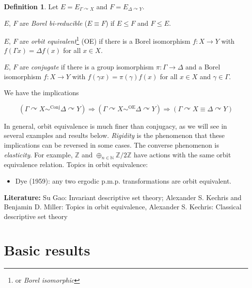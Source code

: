 \documentclass[10pt]{amsart}
\newcommand{\ZZ}{\mathbb{Z}}
\newcommand{\NN}{\mathbb{N}}
\theoremstyle{definition}
\newtheorem*{definition*}{Definition}
\theoremstyle{remark}
\newenvironment{enumerate-(a)}{\begin{enumerate}[label={\upshape (\alph*)}, leftmargin=2pc]}{\end{enumerate}}
\begin{document}
\begin{definition*} 
Let $E=E_{\Gamma\curvearrowright X}$ and $F=E_{\Delta\curvearrowright Y}$. 

\begin{enumerate-(a)} 
\item 
$E$, $F$ are \emph{Borel bi-reducible} ($E\equiv F$) if $E\leq F$ and $F\leq E$. 
\item 
$E$, $F$ are \emph{orbit equivalent}\footnote{or \emph{Borel isomorphic}} (OE) if there is a Borel isomorphism $f\colon X\rightarrow Y$ with $f(\Gamma x)=\Delta f(x)$ for all $x\in X$. 
\item 
$E$, $F$ are \emph{conjugate} if there is a group isomorphism $\pi\colon \Gamma\rightarrow \Delta$ and a Borel isomorphism $f\colon X\rightarrow Y$ with $f(\gamma x)= \pi(\gamma) f(x)$ for all $x\in X$ and $\gamma\in \Gamma$. 
\end{enumerate-(a)} 
\end{definition*} 

We have the implications 

$$(\Gamma\curvearrowright X \sim^{\mathrm{Conj}} \Delta\curvearrowright Y) \Longrightarrow 
(\Gamma\curvearrowright X \sim^{\mathrm{OE}} \Delta\curvearrowright Y) \Longrightarrow 
(\Gamma\curvearrowright X \equiv \Delta\curvearrowright Y) $$ 

In general, orbit equivalence is much finer than conjugacy, as we will see in several examples and results below. 
\emph{Rigidity} is the phenomenon that these implications can be reversed in some cases. 
The converse phenomenon is \emph{elasticity}. For example, $\ZZ$ and $\oplus_{n\in\NN} \ZZ/2\ZZ$ have actions with the same orbit equivalence relation. 
Topics in orbit equivalence: 

\begin{itemize} 
\item 
Dye (1959): any two ergodic p.m.p. transformations are orbit equivalent. 
\end{itemize} 

\bigskip 
\noindent 
{\bf Literature:} 
Su Gao: Invariant descriptive set theory; 
Alexander S. Kechris and Benjamin D. Miller: Topics in orbit equivalence, 
Alexander S. Kechris: Classical descriptive set theory 






\section{Basic results} 
\end{document}
